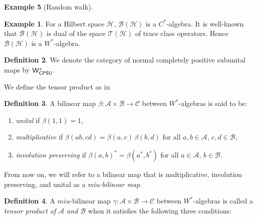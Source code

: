 \documentclass[10pt,a4paper]{amsart}
\theoremstyle{definition}
\newtheorem{definition}{Definition}[section]
\theoremstyle{definition}
\newtheorem{example}[definition]{Example}
\theoremstyle{definition}
\theoremstyle{definition}
\theoremstyle{definition}
\theoremstyle{definition}
\begin{document}
\begin{example}[Random walk]
\begin{example}
   For a Hilbert space $\mathcal{H}$, $\mathcal{B}(\mathcal{H})$ is a $C^*$-algebra. It is well-known that  $\mathcal{B}(\mathcal{H})$ is dual of the space  $\mathcal{T}(\mathcal{H})$ of trace class operators. Hence $\mathcal{B}(\mathcal{H})$ is a $W^*$-algebra. %
\end{example}


\begin{definition}
  We denote the category of normal completely positive subunital maps by $\mathsf{W^*_{CPSU}}$.
\end{definition}

We define the tensor product as in \cite[Definition 108 I]{westerbaanCategoryNeumannAlgebras2019}

\begin{definition}
  A bilinear map \( \beta:  \mathcal{A} \times  \mathcal{B} \to  \mathcal{C} \) between $W^*$-algebras is said to be:

\begin{enumerate}
    \item \emph{unital} if \( \beta(1,1) = 1 \),
    \item \emph{multiplicative} if \( \beta(ab, cd) = \beta(a, c) \, \beta(b, d) \) for all \( a, b \in \mathcal{A} \), \( c, d \in \mathcal{B} \),
    \item \emph{involution preserving} if \( \beta(a, b)^* = \beta(a^*, b^*) \) for all \( a \in \mathcal{A} \), \( b \in \mathcal{B} \).
\end{enumerate}
From now on, we will refer to a bilinear map that is multiplicative, involution preserving, and unital as a \emph{miu-bilinear map}.
\end{definition}


\begin{definition}
  A \(miu\)-bilinear map \( \gamma: \mathcal{A} \times \mathcal{B} \to \mathcal{C} \) between $W^*$-algebras is called a \emph{tensor product of \( \mathcal{A} \) and \( \mathcal{B} \)} when it satisfies the following three conditions:


\end{definition}
\end{example}
\end{document}
